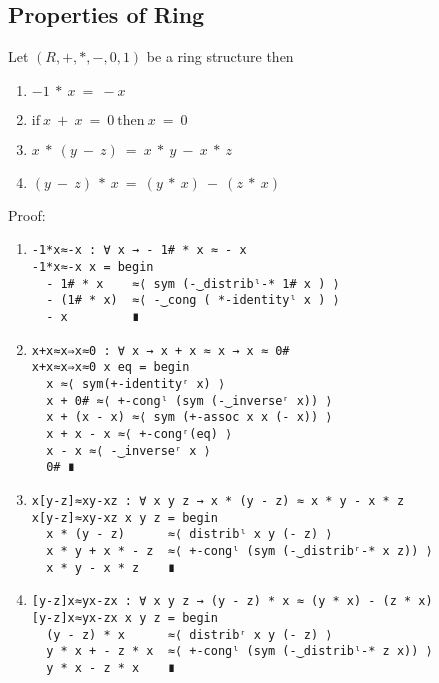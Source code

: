 \subsection{Properties of Ring}
Let $(R, +, *, -, 0, 1)$ be a ring structure then
\begin{enumerate}
\item \(- 1\ *\ x\ =\ -x\)
\item \(\text{if}\ x\ +\ x\ =\ 0\ \text{then}\ x\ =\ 0\)
\item \(x\ *\ (y\ -\ z)\ =\ x\ *\ y\ -\ x\ *\ z\)
\item \((y\ -\ z)\ *\ x\ =\ (y\ *\ x)\ -\ (z\ *\ x)\)
\end{enumerate}
Proof:
\begin{enumerate}
\item
\begin{verbatim}
-1*x≈-x : ∀ x → - 1# * x ≈ - x
-1*x≈-x x = begin
  - 1# * x    ≈⟨ sym (-‿distribˡ-* 1# x ) ⟩
  - (1# * x)  ≈⟨ -‿cong ( *-identityˡ x ) ⟩
  - x         ∎
\end{verbatim}
\item
\begin{verbatim}
x+x≈x⇒x≈0 : ∀ x → x + x ≈ x → x ≈ 0#
x+x≈x⇒x≈0 x eq = begin
  x ≈⟨ sym(+-identityʳ x) ⟩
  x + 0# ≈⟨ +-congˡ (sym (-‿inverseʳ x)) ⟩
  x + (x - x) ≈⟨ sym (+-assoc x x (- x)) ⟩
  x + x - x ≈⟨ +-congʳ(eq) ⟩
  x - x ≈⟨ -‿inverseʳ x ⟩
  0# ∎
\end{verbatim}
\item
\begin{verbatim}
x[y-z]≈xy-xz : ∀ x y z → x * (y - z) ≈ x * y - x * z
x[y-z]≈xy-xz x y z = begin
  x * (y - z)      ≈⟨ distribˡ x y (- z) ⟩
  x * y + x * - z  ≈⟨ +-congˡ (sym (-‿distribʳ-* x z)) ⟩
  x * y - x * z    ∎
\end{verbatim}
\item
\begin{verbatim}
[y-z]x≈yx-zx : ∀ x y z → (y - z) * x ≈ (y * x) - (z * x)
[y-z]x≈yx-zx x y z = begin
  (y - z) * x      ≈⟨ distribʳ x y (- z) ⟩
  y * x + - z * x  ≈⟨ +-congˡ (sym (-‿distribˡ-* z x)) ⟩
  y * x - z * x    ∎
\end{verbatim}
\end{enumerate}